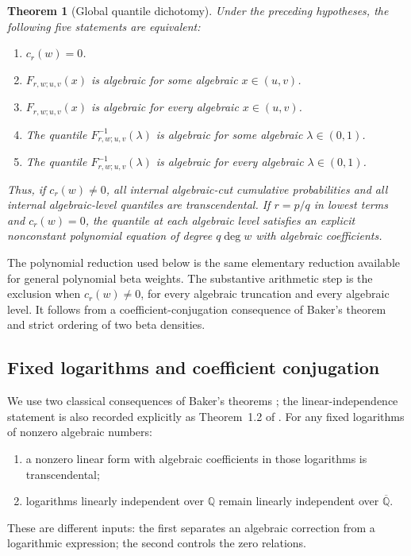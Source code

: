\documentclass[11pt,a4paper]{article}
\newtheorem{theorem}{Theorem}[section]
\theoremstyle{definition}
\theoremstyle{remark}
\numberwithin{equation}{section}
\begin{document}
\begin{theorem}[Global quantile dichotomy]\label{p7:cb:main}
Under the preceding hypotheses, the following five statements are
equivalent:
\begin{enumerate}
\item $c_r(w)=0$.
\item $F_{r,w;u,v}(x)$ is algebraic for some algebraic $x\in(u,v)$.
\item $F_{r,w;u,v}(x)$ is algebraic for every algebraic $x\in(u,v)$.
\item The quantile $F_{r,w;u,v}^{-1}(\lambda)$ is algebraic for some
      algebraic $\lambda\in(0,1)$.
\item The quantile $F_{r,w;u,v}^{-1}(\lambda)$ is algebraic for every
      algebraic $\lambda\in(0,1)$.
\end{enumerate}
Thus, if $c_r(w)\ne0$, all internal algebraic-cut cumulative
probabilities and all internal algebraic-level quantiles are
transcendental. If $r=p/q$ in lowest terms and $c_r(w)=0$, the
quantile at each algebraic level satisfies an explicit nonconstant
polynomial equation of degree $q\deg w$ with algebraic coefficients.
\end{theorem}

The polynomial reduction used below is the same elementary reduction
available for general polynomial beta weights. The substantive arithmetic
step is the exclusion when $c_r(w)\ne0$, for every algebraic truncation
and every algebraic level. It follows from a coefficient-conjugation
consequence of Baker's theorem and strict ordering of two beta densities.

\subsection{Fixed logarithms and coefficient conjugation}

We use two classical consequences of Baker's theorems
\cite{p7:cb:BakerI,p5:aq:BakerIII}; the linear-independence statement is
also recorded explicitly as Theorem~1.2 of \cite{p7:cb:Dasgupta}.
For any fixed logarithms of nonzero algebraic numbers:
\begin{enumerate}
\item a nonzero linear form with algebraic coefficients in those
      logarithms is transcendental;
\item logarithms linearly independent over $\mathbb Q$ remain
      linearly independent over $\overline{\mathbb Q}$.
\end{enumerate}
These are different inputs: the first separates an algebraic correction
from a logarithmic expression; the second controls the zero relations.
\end{document}
